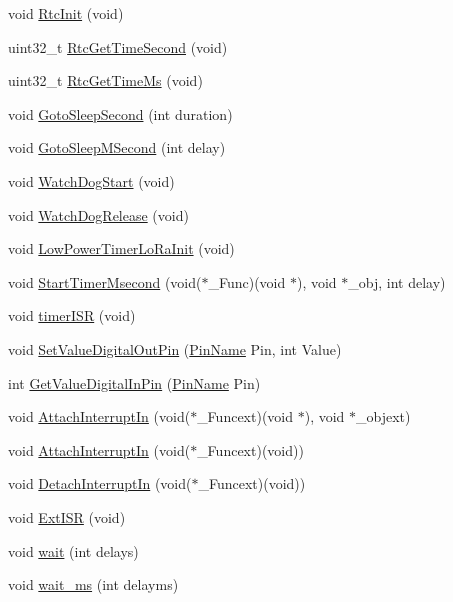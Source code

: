 \begin{DoxyCompactItemize}
\item 
void \mbox{\hyperlink{class_mcu_s_t_m32_l4_ac8cda7ce6ac857e05a2158998794f373}{Rtc\+Init}} (void)
\item 
uint32\+\_\+t \mbox{\hyperlink{class_mcu_s_t_m32_l4_a193ea0ee797296bfd537bc64d36dea04}{Rtc\+Get\+Time\+Second}} (void)
\item 
uint32\+\_\+t \mbox{\hyperlink{class_mcu_s_t_m32_l4_a71dae6a30ca01e74a880313dfb9411b0}{Rtc\+Get\+Time\+Ms}} (void)
\item 
void \mbox{\hyperlink{class_mcu_s_t_m32_l4_a083d387963ab5fcd70332b156b3762c6}{Goto\+Sleep\+Second}} (int duration)
\item 
void \mbox{\hyperlink{class_mcu_s_t_m32_l4_a69544c445e1ba98745aa2ee356cb3aea}{Goto\+Sleep\+M\+Second}} (int delay)
\item 
void \mbox{\hyperlink{class_mcu_s_t_m32_l4_a23e5654a6ab8be1c439e6831dd41dc42}{Watch\+Dog\+Start}} (void)
\item 
void \mbox{\hyperlink{class_mcu_s_t_m32_l4_ae993ca7724a79b4cb09b4e0a316b62bb}{Watch\+Dog\+Release}} (void)
\item 
void \mbox{\hyperlink{class_mcu_s_t_m32_l4_a8237012accef6d0554d491ed5bd75900}{Low\+Power\+Timer\+Lo\+Ra\+Init}} (void)
\item 
void \mbox{\hyperlink{class_mcu_s_t_m32_l4_adfcfb7d44411a41adb849b57c5b55ce8}{Start\+Timer\+Msecond}} (void($\ast$\+\_\+\+Func)(void $\ast$), void $\ast$\+\_\+obj, int delay)
\item 
void \mbox{\hyperlink{class_mcu_s_t_m32_l4_a4eb783771621fc8b559ccd7c3302e13f}{timer\+I\+SR}} (void)
\item 
void \mbox{\hyperlink{class_mcu_s_t_m32_l4_af5c82155fbbbdccfeb5f9329990cc0f8}{Set\+Value\+Digital\+Out\+Pin}} (\mbox{\hyperlink{_class_s_t_m32_l0_8h_a5ceb873075d76667eb54dc6a7d2734d1}{Pin\+Name}} Pin, int Value)
\item 
int \mbox{\hyperlink{class_mcu_s_t_m32_l4_aa53ed559e38c36adb88ecd5cfbf138b6}{Get\+Value\+Digital\+In\+Pin}} (\mbox{\hyperlink{_class_s_t_m32_l0_8h_a5ceb873075d76667eb54dc6a7d2734d1}{Pin\+Name}} Pin)
\item 
void \mbox{\hyperlink{class_mcu_s_t_m32_l4_a35c9c0dc246fb5481f03d30a3af20f15}{Attach\+Interrupt\+In}} (void($\ast$\+\_\+\+Funcext)(void $\ast$), void $\ast$\+\_\+objext)
\item 
void \mbox{\hyperlink{class_mcu_s_t_m32_l4_a7940406b8d23128dd0550f4378dced11}{Attach\+Interrupt\+In}} (void($\ast$\+\_\+\+Funcext)(void))
\item 
void \mbox{\hyperlink{class_mcu_s_t_m32_l4_a7cc86d66c729307b6b618f5f32139f61}{Detach\+Interrupt\+In}} (void($\ast$\+\_\+\+Funcext)(void))
\item 
void \mbox{\hyperlink{class_mcu_s_t_m32_l4_a0059d78e27e65734ad243cc0a5272fc4}{Ext\+I\+SR}} (void)
\item 
void \mbox{\hyperlink{class_mcu_s_t_m32_l4_ab861c14dba5d68a7eaebb31fdaac745b}{wait}} (int delays)
\item 
void \mbox{\hyperlink{class_mcu_s_t_m32_l4_a3e9a267296f3b9281f3213fbfa9328e3}{wait\+\_\+ms}} (int delayms)
\end{DoxyCompactItemize}
